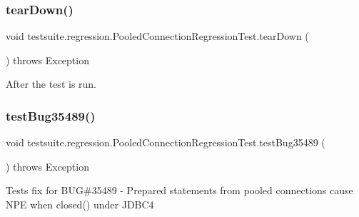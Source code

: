 \subsubsection{\texorpdfstring{tear\+Down()}{tearDown()}}
{\footnotesize\ttfamily void testsuite.\+regression.\+Pooled\+Connection\+Regression\+Test.\+tear\+Down (\begin{DoxyParamCaption}{ }\end{DoxyParamCaption}) throws Exception}

After the test is run. \mbox{\label{classtestsuite_1_1regression_1_1_pooled_connection_regression_test_ae448a81e77d17829c9e922b7859ef609}} 
\subsubsection{\texorpdfstring{test\+Bug35489()}{testBug35489()}}
{\footnotesize\ttfamily void testsuite.\+regression.\+Pooled\+Connection\+Regression\+Test.\+test\+Bug35489 (\begin{DoxyParamCaption}{ }\end{DoxyParamCaption}) throws Exception}

Tests fix for B\+UG\#35489 -\/ Prepared statements from pooled connections cause N\+PE when closed() under J\+D\+B\+C4


